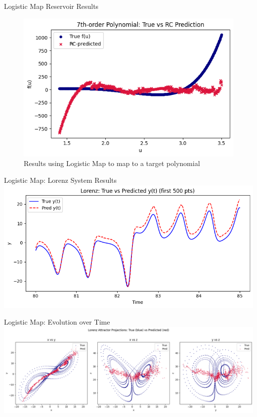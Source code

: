 \documentclass{beamer}
\begin{document}
\begin{frame}{Logistic Map Reservoir Results}
\begin{figure}
\centering
\includegraphics[width=0.75\linewidth]{figures/logistic_7th_degree.png}
\caption{Results using Logistic Map to map to a target polynomial}
\end{figure}
\end{frame}

\begin{frame}{Logistic Map: Lorenz System Results}
\includegraphics[width=1\linewidth]{figures/lorentz_logistic_pred_true.png}
\caption{Results for the Lorenz attractor using Logistic Map}
\end{frame}

\begin{frame}{Logistic Map: Evolution over Time}
\includegraphics[width=1\linewidth]{figures/lorenz_logistic_pred_diagram.png}
\caption{Results for the Lorenz attractor using Logistic Map, evolution of different axes over time}
\end{frame}
\end{document}
